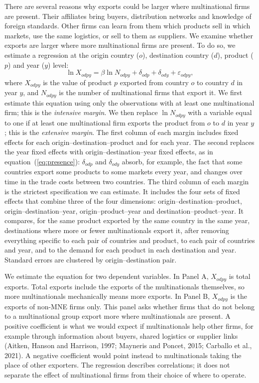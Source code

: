 \documentclass[11pt,a4paper]{article}
\begin{document}
There are several reasons why exports could be larger where multinational firms are present. Their
affiliates bring buyers, distribution networks and knowledge of foreign standards. Other firms can
learn from them which products sell in which markets, use the same logistics, or sell to them as
suppliers. We examine whether exports are larger where more multinational firms are present. To
do so, we estimate a regression at the origin country ($o$), destination country ($d$), product ($p$) and
year ($y$) level:
\begin{equation}\label{eq:presence}
\ln X_{odpy} = \beta \ln N_{odpy} + \delta_{odp} + \delta_{ody} + \varepsilon_{odpy},
\end{equation}
where $X_{odpy}$ is the value of product $p$ exported from country $o$ to country $d$ in year
$y$, and $N_{odpy}$ is the number of multinational firms that export it. We first estimate this
equation using only the observations with at least one multinational firm; this is the
\emph{intensive margin}. We then replace $\ln N_{odpy}$ with a variable equal to one if at least
one multinational firm exports the product from $o$ to $d$ in year $y$; this is the
\emph{extensive margin}. The first column of each margin includes fixed effects for each
origin--destination--product and for each year. The second replaces the year fixed effects with
origin--destination--year fixed effects, as in equation~(\ref{eq:presence}): $\delta_{odp}$ and
$\delta_{ody}$ absorb, for example, the fact that some countries export some products to some
markets every year, and changes over time in the trade costs between two countries. The third
column of each margin is the strictest specification we can estimate. It includes the four
sets of fixed effects that combine three of the four dimensions: origin--destination--product,
origin--destination--year, origin--product--year and destination--product--year. It compares, for
the same product exported by the same country in the same year, destinations where more or fewer
multinationals export it, after removing everything specific to each pair of countries and product,
to each pair of countries and year, and to the demand for each product in each destination and year. Standard
errors are clustered by origin--destination pair.

We estimate the equation for two dependent variables. In Panel A, $X_{odpy}$ is total exports. Total exports include the
exports of the multinationals themselves, so more multinationals mechanically means more exports.
In Panel B, $X_{odpy}$ is the exports of non-MNE firms only. This panel asks whether firms that do
not belong to a multinational group export more where multinationals are present. A positive
coefficient is what we would expect if multinationals help other firms, for example through
information about buyers, shared logistics or supplier links (Aitken, Hanson and Harrison, 1997;
Mayneris and Poncet, 2015; Carballo et al., 2021). A negative coefficient would point instead to
multinationals taking the place of other exporters. The regression describes correlations; it does
not separate the effect of multinational firms from their choice of where to operate.
\end{document}
